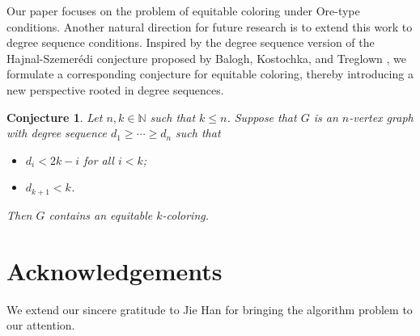\documentclass[11pt, a4paper]{article}
\newtheorem{conj}[theorem]{Conjecture}
\theoremstyle{definition}
\newcommand{\<}{\subseteq}
\begin{document}
Our paper focuses on the problem of equitable coloring under Ore-type conditions. Another natural direction for future research is to extend this work to degree sequence conditions. Inspired by the degree sequence version of the Hajnal-Szemer\'{e}di conjecture proposed by Balogh, Kostochka, and Treglown \cite{BKT2013}, we formulate a corresponding conjecture for equitable coloring, thereby introducing a new perspective rooted in degree sequences.


\begin{conj}
    Let $n,k\in \mathbb{N}$ such that $k\le n$. Suppose that $G$ is an $n$-vertex graph with degree sequence $d_1\ge  \cdots \ge d_n$ such that 
    \begin{itemize}
        \item $d_i< 2k-i$ for all $i< k$;
        \item $d_{k+1}<k$.
    \end{itemize}
Then $G$ contains an equitable $k$-coloring.
\end{conj}

\section*{Acknowledgements}
We extend our sincere gratitude to Jie Han for bringing the algorithm problem to our attention. 














\end{document}
